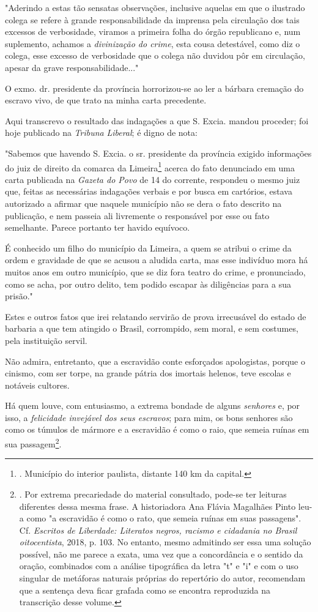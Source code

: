 "Aderindo a estas tão sensatas observações, inclusive aquelas em que o
ilustrado colega se refere à grande responsabilidade da imprensa pela
circulação dos tais excessos de verbosidade, viramos a primeira folha do
órgão republicano e, num suplemento, achamos a \emph{divinização do
crime}, esta cousa detestável, como diz o colega, esse excesso de
verbosidade que o colega não duvidou pôr em circulação, apesar da grave
responsabilidade..."

O exmo. dr. presidente da província horrorizou-se ao ler a bárbara
cremação do escravo vivo, de que trato na minha carta precedente.

Aqui transcrevo o resultado das indagações a que S. Excia. mandou
proceder; foi hoje publicado na \emph{Tribuna} \emph{Liberal}; é digno
de nota:

"Sabemos que havendo S. Excia. o sr. presidente da província exigido
informações do juiz de direito da comarca da Limeira\footnote{.
  Município do interior paulista, distante 140 km da capital.} acerca do
fato denunciado em uma carta publicada na \emph{Gazeta do Povo} de 14 do
corrente, respondeu o mesmo juiz que, feitas as necessárias indagações
verbais e por busca em cartórios, estava autorizado a afirmar que
naquele município não se dera o fato descrito na publicação, e nem
passeia ali livremente o responsável por esse ou fato semelhante. Parece
portanto ter havido equívoco.

É conhecido um filho do município da Limeira, a quem se atribui o crime
da ordem e gravidade de que se acusou a aludida carta, mas esse
indivíduo mora há muitos anos em outro município, que se diz fora teatro
do crime, e pronunciado, como se acha, por outro delito, tem podido
escapar às diligências para a sua prisão."

Estes e outros fatos que irei relatando servirão de prova irrecusável do
estado de barbaria a que tem atingido o Brasil, corrompido, sem moral, e
sem costumes, pela instituição servil.

Não admira, entretanto, que a escravidão conte esforçados apologistas,
porque o cinismo, com ser torpe, na grande pátria dos imortais helenos,
teve escolas e notáveis cultores.

Há quem louve, com entusiasmo, a extrema bondade de alguns
\emph{senhores} e, por isso, a \emph{felicidade invejável dos seus
escravos}; para mim, os bons senhores são como os túmulos de mármore e a
escravidão é como o raio, que semeia ruínas em sua passagem\footnote{.
  Por extrema precariedade do material consultado, pode-se ter leituras
  diferentes dessa mesma frase. A historiadora Ana Flávia Magalhães
  Pinto leu-a como "a escravidão é como o rato, que semeia ruínas em
  suas passagens". Cf. \emph{Escritos de Liberdade: Literatos negros,
  racismo e cidadania no Brasil oitocentista}, 2018, p. 103. No entanto,
  mesmo admitindo ser essa uma solução possível, não me parece a exata,
  uma vez que a concordância e o sentido da oração, combinados com a
  análise tipográfica da letra "t" e "i" e com o uso singular de
  metáforas naturais próprias do repertório do autor, recomendam que a
  sentença deva ficar grafada como se encontra reproduzida na
  transcrição desse volume.}.

